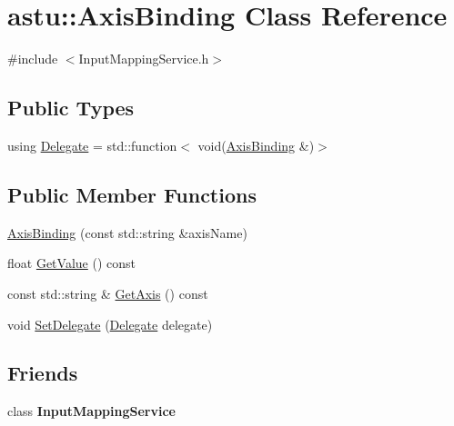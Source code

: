 \hypertarget{classastu_1_1AxisBinding}{}\section{astu\+:\+:Axis\+Binding Class Reference}
\label{classastu_1_1AxisBinding}


{\ttfamily \#include $<$Input\+Mapping\+Service.\+h$>$}

\subsection*{Public Types}
\begin{DoxyCompactItemize}
\item 
using \hyperlink{classastu_1_1AxisBinding_a38f398d407de503bd52019e244fa9687}{Delegate} = std\+::function$<$ void(\hyperlink{classastu_1_1AxisBinding}{Axis\+Binding} \&)$>$
\end{DoxyCompactItemize}
\subsection*{Public Member Functions}
\begin{DoxyCompactItemize}
\item 
\hyperlink{classastu_1_1AxisBinding_a196fdc402dcf64aa507e6d6b9d3757f9}{Axis\+Binding} (const std\+::string \&axis\+Name)
\item 
float \hyperlink{classastu_1_1AxisBinding_a94ddec4241c656506512c312251374b6}{Get\+Value} () const
\item 
const std\+::string \& \hyperlink{classastu_1_1AxisBinding_acc8029d84009c364c17268af4adf4b59}{Get\+Axis} () const
\item 
void \hyperlink{classastu_1_1AxisBinding_a5e7b784a68d99a9ed6fa652e55ecbad4}{Set\+Delegate} (\hyperlink{classastu_1_1AxisBinding_a38f398d407de503bd52019e244fa9687}{Delegate} delegate)
\end{DoxyCompactItemize}
\subsection*{Friends}
\begin{DoxyCompactItemize}
\item 
\mbox{\label{classastu_1_1AxisBinding_a8a886d4dcb7950d2c68f97f528f5ab4c}} 
class {\bfseries Input\+Mapping\+Service}
\end{DoxyCompactItemize}


